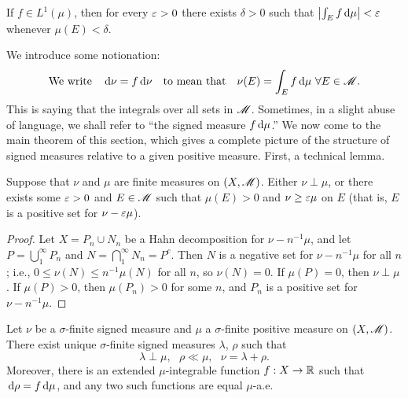 \documentclass[12pt]{article} %
\begin{document}
\begin{corollary}
    If $f \in L^1(\mu)$, then for every $\varepsilon > 0$ there exists $\delta > 0$ such that $\left|\int_E f \, \mathrm{d} \mu\right| < \varepsilon$ whenever $\mu(E) < \delta$.
\end{corollary}

We introduce some notionation: \[\text{We write} \ \ \ \, \mathrm{d} \nu = f \, \mathrm{d} \nu \ \ \ \text{to mean that} \ \ \ \nu(E) = \int_E f \, \mathrm{d} \mu \ \forall E \in \mathscr{M}.\] This is saying that the integrals over all sets in $\mathscr{M}$. Sometimes, in a slight abuse of language, we shall refer to ``the signed measure $f \, \mathrm{d} \mu$.'' We now come to the main theorem of this section, which gives a complete picture of the structure of signed measures relative to a given positive measure. First, a technical lemma.

\begin{lemma}\label{lem:radon-nikodym-technical}
    Suppose that $\nu$ and $\mu$ are finite measures on $(X, \mathscr{M})$. Either $\nu \perp \mu$, or there exists some $\varepsilon > 0$ and $E \in \mathscr{M}$ such that $\mu(E) > 0$ and $\nu \geq \varepsilon \mu$ on $E$ (that is, $E$ is a positive set for $\nu - \varepsilon \mu$).
\end{lemma}

\begin{proof}
    Let $X = P_n \cup N_n$ be a Hahn decomposition for $\nu - n^{-1}\mu$, and let $P = \bigcup_1^\infty P_n$ and $N = \bigcap_1^\infty N_n = P^c$. Then $N$ is a negative set for $\nu - n^{-1}\mu$ for all $n$; i.e., $0 \leq \nu(N) \leq n^{-1}\mu(N)$ for all $n$, so $\nu(N) = 0$. If $\mu(P) = 0$, then $\nu \perp \mu$. If $\mu(P) > 0$, then $\mu(P_n) > 0$ for some $n$, and $P_n$ is a positive set for $\nu - n^{-1}\mu$.
\end{proof}

\begin{theorem}\label{thm:radon-nikodym}
    Let $\nu$ be a $\sigma$-finite signed measure and $\mu$ a $\sigma$-finite positive measure on $(X, \mathscr{M})$. There exist unique $\sigma$-finite signed measures $\lambda$, $\rho$ such that \[\lambda \perp \mu, \ \ \ \rho \ll \mu, \ \ \ \nu = \lambda + \rho.\] Moreover, there is an extended $\mu$-integrable function $f : X \to \mathbb{R}$ such that $\, \mathrm{d} \rho = f \, \mathrm{d} \mu$, and any two such functions are equal $\mu$-a.e.
\end{theorem}
\end{document}
